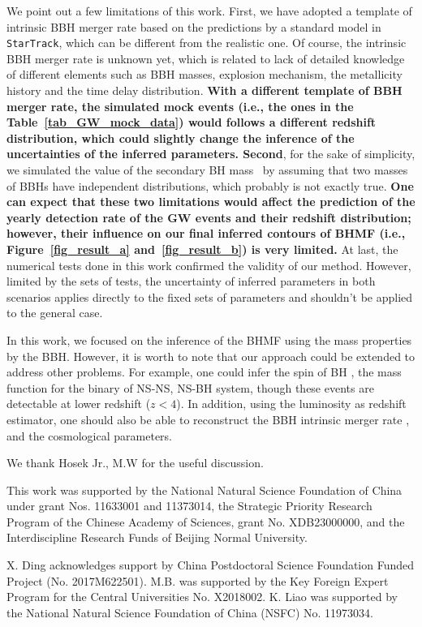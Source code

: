 \documentclass[twocolumn]{aastex62}
\begin{document}
We point out a few limitations of this work. First, we have adopted a template of intrinsic BBH merger rate based on the predictions by a standard model in {\tt StarTrack}, which can be different from the realistic one. Of course, the intrinsic BBH merger rate is unknown yet, which is related to lack of detailed knowledge of different elements such as BBH masses, explosion mechanism, the metallicity history and the time delay distribution. {\bf With a different template of BBH merger rate, the simulated mock events (i.e., the ones in the Table~\ref{tab_GW_mock_data}) would follows a different redshift distribution, which could slightly change the inference of the uncertainties of the inferred parameters. Second}, for the sake of simplicity, we simulated the value of the secondary BH mass \mtwo\ by assuming that two masses of BBHs have independent distributions, which probably is not exactly true. {\bf One can expect that these two limitations would affect the prediction of the yearly detection rate of the GW events and their redshift distribution; however, their influence on our final inferred contours of BHMF (i.e., Figure~\ref{fig_result_a} and~\ref{fig_result_b}) is very limited.} 
At last, the numerical tests done in this work confirmed the validity of our method. However, limited by the sets of tests, the uncertainty of inferred parameters  in both scenarios applies directly to the fixed sets of parameters and shouldn't be applied to the general case.

In this work, we focused on the inference of the BHMF using the mass properties by the BBH. However, it is worth to note that our approach could be extended to address other problems. For example, one could infer the spin of BH \citep{Abbott2018b}, the mass function for the binary of NS-NS, NS-BH system, though these events are detectable at lower redshift ($z<4$). In addition, using the luminosity as redshift estimator, one should also be able to reconstruct the BBH intrinsic merger rate \citep{Fishbach2018}, and the cosmological parameters.


\acknowledgments
We thank Hosek Jr., M.W for the useful discussion.

This work was supported by the National Natural Science Foundation of China under grant Nos. 11633001 and 11373014, the Strategic Priority Research Program of the Chinese Academy of Sciences, grant No. XDB23000000, and the Interdiscipline Research Funds of Beijing Normal University.

X. Ding acknowledges support by China Postdoctoral Science Foundation Funded Project (No. 2017M622501).
M.B. was supported by the Key Foreign Expert Program for the Central Universities No. X2018002.
K. Liao was supported by the National Natural Science Foundation of China (NSFC) No. 11973034.
\end{document}
